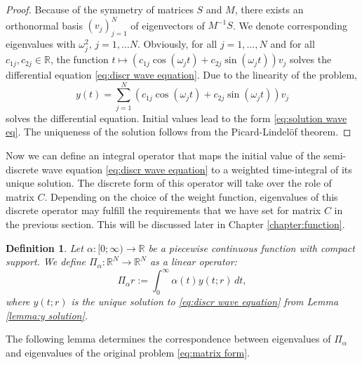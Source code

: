 \documentclass[a4paper,11pt,bibliography=totoc,listof=totoc,headinclude=true,cleardoublepage=empty,oneside]{scrbook}
\newtheorem{definition}[theorem]{Definition}
\newcommand{\R}{\mathbb{R}}
\begin{document}
\begin{proof}
    Because of the symmetry of matrices $S$ and $M$, there exists an orthonormal basis $(v_j)_{j=1}^N$ of eigenvectors of $M^{-1}S$. We denote corresponding eigenvalues with $\omega_j^2$, $j=1, \dots N$. Obviously, for all $j=1, \dots, N$ and for all $c_{1j}, c_{2j}\in \R$, the function $t\mapsto \left(c_{1j} \cos(\omega_j t) + c_{2j} \sin(\omega_j t)\right)v_j$ solves the differential equation \eqref{eq:discr wave equation}. Due to the linearity of the problem, 
    \begin{equation*}
        y(t) = \sum_{j=1}^N \left(c_{1j} \cos(\omega_j t) + c_{2j} \sin(\omega_j t)\right)v_j
    \end{equation*}
    solves the differential equation. Initial values lead to the form \eqref{eq:solution wave eq}. The uniqueness of the solution follows from the Picard-Lindelöf theorem.
\end{proof}

Now we can define an integral operator that maps the initial value of the semi-discrete wave equation \eqref{eq:discr wave equation} to a weighted time-integral of its unique solution. The discrete form of this operator will take over the role of matrix $C$. Depending on the choice of the weight function, eigenvalues of this discrete operator may fulfill the requirements that we have set for matrix $C$ in the previous section. This will be discussed later in Chapter \ref{chapter:function}. 

\begin{definition}\label{def:pi_alpha}
    Let $\alpha: [0; \infty) \rightarrow \R$ be a piecewise continuous function with compact support. We define $\Pi_\alpha: \R^N \rightarrow \R^N$ as a linear operator:
    \begin{equation*}
        \Pi_\alpha r := \int_0^\infty \alpha(t) y(t;r) \,dt,
    \end{equation*}
    where $y(t;r)$ is the unique solution to \eqref{eq:discr wave equation} from Lemma \ref{lemma:y solution}.
\end{definition}

The following lemma determines the correspondence between eigenvalues of $\Pi_\alpha$ and eigenvalues of the original problem \eqref{eq:matrix form}.
\end{document}
